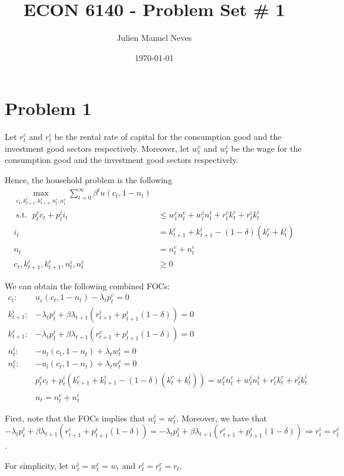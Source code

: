 \documentclass[12pt]{article}
\title{ECON 6140 - Problem Set \# 1}
\date{\today}
\author{Julien Manuel Neves}
\newcommand{\1}{{\bf 1}} %
\DeclareMathOperator{\subjectto}{{s.t.\ }} %
\begin{document}
\maketitle

\section*{Problem 1}
Let $r_t^c$ and $r_t^i$ be the rental rate of capital for the consumption good and the investment good sectors respectively. Moreover, let $w_t^c$ and $w_t^i$ be the wage for the consumption good and the investment good sectors respectively.

Hence, the household problem is the following
		\begin{align*}
	\max_{c_t,k_{t+1}^i,k_{t+1}^c,n_{t}^i,n_{t}^c} \sum_{t=0}^{\infty}\beta^t u(c_t,1-n_t) \\
	\subjectto p_t^cc_t+p_t^ii_t &\leq w_t^cn_t^c+w_t^in_t^i+ r_t^ck_t^c+r_t^ik_t^i  \\
i_t &=	k_{t+1}^c+k_{t+1}^i-(1-\delta)(k_t^c+k_t^i)  \\
n_t &=	n_t^c+n_t^i  \\
c_t,k_{t+1}^i,k_{t+1}^c,n_{t}^i,n_{t}^c	& \geq 0
	\end{align*}
	
We can obtain the following combined FOCs:
	\begin{align*}	
	c_t: & u_c(c_t,1-n_t) - \lambda_t  p_t^c =0 \\
	k_{t+1}^i:& -\lambda_tp_t^i +\beta \lambda_{t+1}(r_{t+1}^i+p_{t+1}^i(1-\delta)) =0\\
	k_{t+1}^c:&-\lambda_tp_t^i + \beta \lambda_{t+1}(r_{t+1}^c+p_{t+1}^i(1-\delta)) =0\\
	n_t^i: & -u_l(c_t,1-n_t) + \lambda_t  w_t^i =0 \\
	n_t^c: & -u_l(c_t,1-n_t) + \lambda_t  w_t^c =0 \\
	&p_t^cc_t+p_t^i(k_{t+1}^c+k_{t+1}^i-(1-\delta)(k_t^c+k_t^i)) =w_t^cn_t^c+w_t^in_t^i+ r_t^ck_t^c+r_t^ik_t^i \\
 & n_t =	n_t^c+n_t^i
	\end{align*}
	
	First, note that the FOCs implies that $w_t^i=w_t^c$. Moreover, we have that $-\lambda_tp_t^i +\beta \lambda_{t+1}(r_{t+1}^i+p_{t+1}^i(1-\delta)) =-\lambda_tp_t^i + \beta \lambda_{t+1}(r_{t+1}^c+p_{t+1}^i(1-\delta))\Rightarrow r_t^i=r_t^c$.
	
	For simplicity, let $w_t^i=w_t^c=w_t$ and $r_t^i=r_t^c=r_t$.
	
\end{document}
